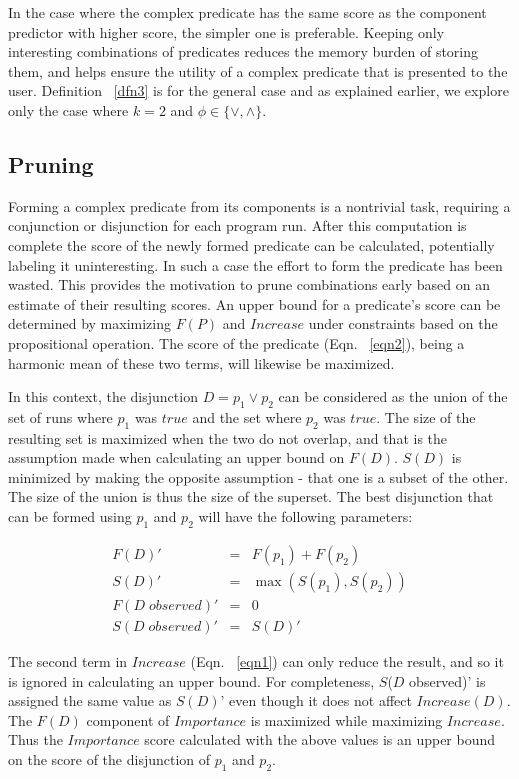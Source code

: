 In the case where the complex predicate has the same score as the component predictor with higher score, the simpler one is preferable.  Keeping only interesting combinations of predicates reduces the memory burden of storing them, and helps ensure the utility of a complex predicate that is presented to the user.  Definition ~\ref{dfn3} is for the general case and as explained earlier, we explore only the case where $k = 2$ and $\phi \in \{\vee, \wedge\}$.

\subsection{Pruning}
\label{sec-pruning}
Forming a complex predicate from its components is a nontrivial task, requiring a conjunction or disjunction for each program run.  After this computation is complete the score of the newly formed predicate can be calculated, potentially labeling it uninteresting.  In such a case the effort to form the predicate has been wasted.  This provides the motivation to prune combinations early based on an estimate of their resulting scores.  An upper bound for a predicate's score can be determined by maximizing $F(P)$ and $Increase$ under constraints based on the propositional operation.  The score of the predicate (Eqn. ~\ref{eqn2}), being a harmonic mean of these two terms, will likewise be maximized.

In this context, the disjunction $D = p_1 \vee p_2$ can be considered as the union of the set of runs where $p_1$ was $true$ and the set where $p_2$ was $true$.  The size of the resulting set is maximized when the two do not overlap, and that is the assumption made when calculating an upper bound on $F(D)$.  $S(D)$ is minimized by making the opposite assumption - that one is a subset of the other.  The size of the union is thus the size of the superset.  The best disjunction that can be formed using $p_1$ and $p_2$ will have the following parameters:

\begin{eqnarray}
 \nonumber %
  F(D)' &=&  F(p_1) + F(p_2) \\
 \nonumber
  S(D)' &=&  \max(S(p_1),S(p_2)) \\
 \nonumber
  F(D\;observed)' &=& 0 \\
 \nonumber
  S(D\;observed)' &=& S(D)'
\end{eqnarray}

The second term in $Increase$ (Eqn. ~\ref{eqn1}) can only reduce the result, and so it is ignored in calculating an upper bound.  For completeness, $S$($D$ observed)' is assigned the same value as $S(D)$' even though it does not affect $Increase(D)$.  The $F(D)$ component of $Importance$ is maximized while maximizing $Increase$.  Thus the $Importance$ score calculated with the above values is an upper bound on the score of the disjunction of $p_1$ and $p_2$.

